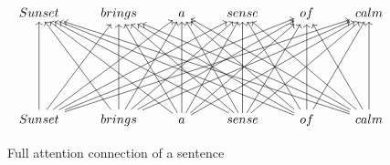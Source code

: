 \begin{figure}[ht]
\[\begin{tikzcd}[row sep=2.25em]
	Sunset & brings & a & sense & of & calm \\
	\\
	\\
	Sunset & brings & a & sense & of & calm
	\arrow[from=4-1, to=1-1]
	\arrow[from=4-1, to=1-2]
	\arrow[from=4-1, to=1-3]
	\arrow[from=4-1, to=1-4]
	\arrow[from=4-1, to=1-5]
	\arrow[from=4-1, to=1-6]
	\arrow[from=4-2, to=1-1]
	\arrow[from=4-2, to=1-2]
	\arrow[from=4-2, to=1-3]
	\arrow[from=4-2, to=1-4]
	\arrow[from=4-2, to=1-5]
	\arrow[from=4-2, to=1-6]
	\arrow[from=4-3, to=1-1]
	\arrow[from=4-3, to=1-2]
	\arrow[from=4-3, to=1-3]
	\arrow[from=4-3, to=1-4]
	\arrow[from=4-3, to=1-5]
	\arrow[from=4-3, to=1-6]
	\arrow[from=4-4, to=1-1]
	\arrow[from=4-4, to=1-2]
	\arrow[from=4-4, to=1-3]
	\arrow[from=4-4, to=1-4]
	\arrow[from=4-4, to=1-5]
	\arrow[from=4-4, to=1-6]
	\arrow[from=4-5, to=1-1]
	\arrow[from=4-5, to=1-2]
	\arrow[from=4-5, to=1-3]
	\arrow[from=4-5, to=1-4]
	\arrow[from=4-5, to=1-5]
	\arrow[from=4-5, to=1-6]
	\arrow[from=4-6, to=1-1]
	\arrow[from=4-6, to=1-2]
	\arrow[from=4-6, to=1-3]
	\arrow[from=4-6, to=1-4]
	\arrow[from=4-6, to=1-5]
	\arrow[from=4-6, to=1-6]
\end{tikzcd}\]
\caption{Full attention connection of a sentence}
\label{chart:full_sentence_attention}
\end{figure}